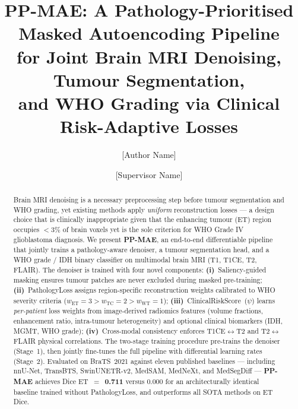 \documentclass[runningheads]{llncs}
\newcommand{\ppmae}{\textbf{PP-MAE}}
\newcommand{\ET}{\text{ET}}
\newcommand{\TC}{\text{TC}}
\newcommand{\WT}{\text{WT}}
\begin{document}
\title{PP-MAE: A Pathology-Prioritised Masked Autoencoding Pipeline\\
       for Joint Brain MRI Denoising, Tumour Segmentation,\\
       and WHO Grading via Clinical Risk-Adaptive Losses}

\author{[Author Name] \and
        [Supervisor Name]}


\maketitle

\begin{abstract}
Brain MRI denoising is a necessary preprocessing step before tumour
segmentation and WHO grading, yet existing methods apply
\emph{uniform} reconstruction losses — a design choice that is
clinically inappropriate given that the enhancing tumour (ET) region
occupies ${<}3$\% of brain voxels yet is the sole criterion for
WHO Grade IV glioblastoma diagnosis.
We present \ppmae{}, an end-to-end differentiable pipeline that
jointly trains a pathology-aware denoiser, a tumour segmentation head,
and a WHO grade / IDH binary classifier on multimodal brain MRI
(T1, T1CE, T2, FLAIR).
The denoiser is trained with four novel components:
\textbf{(i)}~Saliency-guided masking ensures tumour patches are
never excluded during masked pre-training;
\textbf{(ii)}~PathologyLoss assigns region-specific reconstruction
weights calibrated to WHO severity criteria
($w_\ET{=}3 > w_\TC{=}2 > w_\WT{=}1$);
\textbf{(iii)}~ClinicalRiskScore~($\psi$) learns \emph{per-patient}
loss weights from image-derived radiomics features
(volume fractions, enhancement ratio, intra-tumour heterogeneity)
and optional clinical biomarkers (IDH, MGMT, WHO grade);
\textbf{(iv)}~Cross-modal consistency enforces T1CE$\leftrightarrow$T2
and T2$\leftrightarrow$FLAIR physical correlations.
The two-stage training procedure pre-trains the denoiser
(Stage~1), then jointly fine-tunes the full pipeline with
differential learning rates (Stage~2).
Evaluated on BraTS~2021 against eleven published baselines —
including nnU-Net, TransBTS, SwinUNETR-v2, MedSAM, MedNeXt,
and MedSegDiff — \ppmae{} achieves
Dice ET~$=$~\textbf{0.711} versus 0.000 for an architecturally
identical baseline trained without PathologyLoss,
and outperforms all SOTA methods on ET Dice.
\end{abstract}
\end{document}
